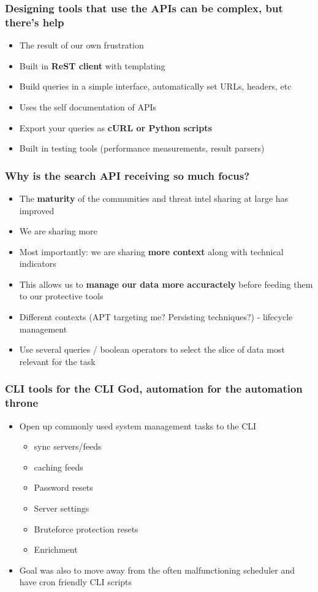 \begin{frame}
\frametitle{Designing tools that use the APIs can be complex, but there's help}
    \begin{itemize}
	\item The result of our own frustration
	\item Built in {\bf ReST client} with templating
	\item Build queries in a simple interface, automatically set URLs, headers, etc
	\item Uses the self documentation of APIs
	\item Export your queries as {\bf cURL or Python scripts}
	\item Built in testing tools (performance measurements, result parsers)
    \end{itemize}
\end{frame}

\begin{frame}
\frametitle{Why is the search API receiving so much focus?}
    \begin{itemize}
	\item The {\bf maturity} of the communities and threat intel sharing at large has improved
	\item We are sharing more
	\item Most importantly: we are sharing {\bf more context} along with technical indicators
	\item This allows us to {\bf manage our data more accuractely} before feeding them to our protective tools
	\item Different contexts (APT targeting me? Persisting techniques?) - lifecycle management
	\item Use several queries / boolean operators to select the slice of data most relevant for the task
    \end{itemize}
\end{frame}

\begin{frame}
\frametitle{CLI tools for the CLI God, automation for the automation throne}
    \begin{itemize}
	\item Open up commonly used system management tasks to the CLI
        \begin{itemize}
            \item sync servers/feeds
            \item caching feeds
            \item Password resets
            \item Server settings
            \item Bruteforce protection resets
            \item Enrichment
        \end{itemize}
        \item Goal was also to move away from the often malfunctioning scheduler and have cron friendly CLI scripts
    \end{itemize}
\end{frame}


